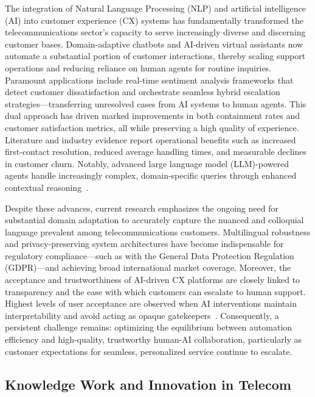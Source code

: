 \documentclass[sigconf]{acmart}
\begin{document}
The integration of Natural Language Processing (NLP) and artificial intelligence (AI) into customer experience (CX) systems has fundamentally transformed the telecommunications sector’s capacity to serve increasingly diverse and discerning customer bases. Domain-adaptive chatbots and AI-driven virtual assistants now automate a substantial portion of customer interactions, thereby scaling support operations and reducing reliance on human agents for routine inquiries. Paramount applications include real-time sentiment analysis frameworks that detect customer dissatisfaction and orchestrate seamless hybrid escalation strategies—transferring unresolved cases from AI systems to human agents. This dual approach has driven marked improvements in both containment rates and customer satisfaction metrics, all while preserving a high quality of experience. Literature and industry evidence report operational benefits such as increased first-contact resolution, reduced average handling times, and measurable declines in customer churn. Notably, advanced large language model (LLM)-powered agents handle increasingly complex, domain-specific queries through enhanced contextual reasoning~\cite{ref18}.

Despite these advances, current research emphasizes the ongoing need for substantial domain adaptation to accurately capture the nuanced and colloquial language prevalent among telecommunications customers. Multilingual robustness and privacy-preserving system architectures have become indispensable for regulatory compliance—such as with the General Data Protection Regulation (GDPR)—and achieving broad international market coverage. Moreover, the acceptance and trustworthiness of AI-driven CX platforms are closely linked to transparency and the ease with which customers can escalate to human support. Highest levels of user acceptance are observed when AI interventions maintain interpretability and avoid acting as opaque gatekeepers~\cite{ref18}. Consequently, a persistent challenge remains: optimizing the equilibrium between automation efficiency and high-quality, trustworthy human-AI collaboration, particularly as customer expectations for seamless, personalized service continue to escalate.

\subsection{Knowledge Work and Innovation in Telecom}
\end{document}
